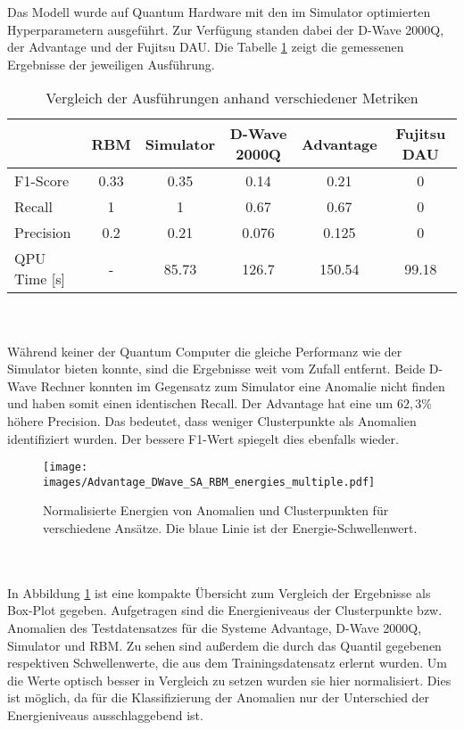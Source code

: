 Das Modell wurde auf Quantum Hardware mit den im Simulator optimierten Hyperparametern ausgeführt.
Zur Verfügung standen dabei der D-Wave 2000Q, der Advantage und der Fujitsu DAU.
Die Tabelle \ref{fig:hardware_comparison} zeigt die gemessenen Ergebnisse der jeweiligen
Ausführung.
\begin{table}[h!]
    \centering
    \begin{tabular}{l | c | c | c | c | c}
     & RBM & Simulator & D-Wave 2000Q & Advantage & Fujitsu DAU \\
      \hline
     F1-Score           & 0.33 &   0.35 &     0.14 &  0.21 & 0  \\
     Recall             &1    &      1 &     0.67 &  0.67 & 0  \\ 
     Precision          &0.2  &   0.21 &    0.076 & 0.125 & 0  \\ 
     QPU Time [s]       &-    &  85.73 &    126.7 & 150.54 & 99.18  \\ 
\end{tabular}
    \caption{Vergleich der Ausführungen anhand verschiedener Metriken}
    \label{fig:hardware_comparison}
\end{table}\\\\
Während keiner der Quantum Computer die gleiche Performanz wie der Simulator bieten konnte,
sind die Ergebnisse weit vom Zufall entfernt. Beide D-Wave Rechner konnten im Gegensatz zum Simulator eine Anomalie nicht
finden und haben somit einen identischen Recall. Der Advantage hat eine um $62,3 \%$ höhere Precision. Das bedeutet,
dass weniger Clusterpunkte als Anomalien identifiziert wurden. Der bessere F1-Wert spiegelt dies ebenfalls wieder.
\begin{figure}[h!]
    \centering
    \texttt{[image: images/Advantage\_DWave\_SA\_RBM\_energies\_multiple.pdf]}
    \caption{Normalisierte Energien von Anomalien und Clusterpunkten für verschiedene Ansätze. Die blaue Linie ist der Energie-Schwellenwert.}
    \label{fig:Energies}
\end{figure}\\\\
In Abbildung \ref{fig:Energies} ist eine kompakte Übersicht zum Vergleich der Ergebnisse als Box-Plot gegeben. Aufgetragen sind die Energieniveaus der Clusterpunkte bzw. Anomalien des Testdatensatzes für die Systeme Advantage, D-Wave 2000Q, Simulator und RBM. Zu sehen sind außerdem die durch das Quantil gegebenen respektiven Schwellenwerte, die aus dem Trainingsdatensatz erlernt wurden. Um die Werte optisch besser in Vergleich zu setzen wurden sie hier normalisiert. Dies ist möglich, da für die Klassifizierung der Anomalien nur der Unterschied der Energieniveaus ausschlaggebend ist.

